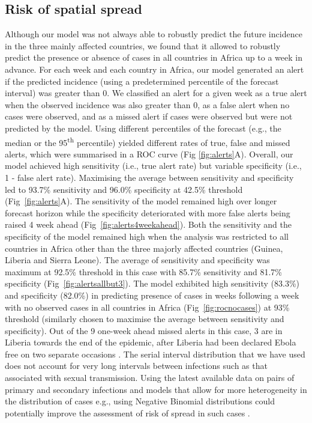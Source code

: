 \documentclass[9pt,twocolumn,twoside,lineno]{pnas-new}
\begin{document}
\subsection*{Risk of spatial spread}
Although our model was not always able to robustly predict the future
incidence in the three mainly affected countries, we found that it
allowed to robustly predict the
presence or absence of cases in all countries in Africa up to a week in
advance. For each week and each country in Africa, our model
generated an alert if the predicted incidence (using a predetermined
percentile of the forecast interval) was greater than 0. We classified
an alert for a given week as a true
alert when the observed incidence was also greater than 0, as a false
alert when no cases were observed, and as a missed alert if cases were
observed but were not predicted by the model. Using different
percentiles of the forecast (e.g., the median or the
95\textsuperscript{th} percentile)
yielded different rates of true, false and missed alerts, which were
summarised in a ROC curve (Fig \ref{fig:alerts}A). Overall, our model 
achieved high sensitivity (i.e., true alert rate) but variable specificity
(i.e., 1 - false alert rate). 
Maximising the average between
sensitivity and specificity led to 93.7\% sensitivity and 
96.0\% specificity at 42.5\% threshold (Fig~\ref{fig:alerts}A). The
sensitivity of the model remained high over longer forecast horizon 
while the specificity deteriorated with more false alerts being raised
4 week ahead (Fig~\ref{fig:alerts4weekahead}). Both the sensitivity
and the specificity of the model remained high when the 
analysis was restricted to all countries in Africa other than
the three majorly affected countries (Guinea, Liberia and Sierra
Leone). The average of sensitivity and specificity was maximum at
92.5\% threshold in this case with 85.7\% sensitivity and 81.7\% specificity
(Fig~\ref{fig:alertsallbut3}). 
The model exhibited 
high sensitivity (83.3\%) and specificity (82.0\%) in predicting 
presence of cases in weeks following a week with no observed cases in 
all countries in Africa (Fig~\ref{fig:rocnocases}) at 93\% threshold 
(similarly chosen to maximise the average between sensitivity and
specificity). Out of the 9 one-week ahead missed alerts in this
case, 3 are in Liberia towards the end of the epidemic, after
Liberia had been declared Ebola free on two separate occasions
\cite{liberiaef1, liberiaef2}. The serial interval distribution
that we have used does not account for very long intervals between
infections such as that associated with sexual transmission. Using the
latest available data on pairs of primary and secondary infections
and models
that allow for more heterogeneity in the distribution of cases e.g.,
using Negative Binomial distributions
could potentially improve the assessment of risk of spread in such
cases \cite{thompson2019improved, eggo2015duration}. 
\end{document}
